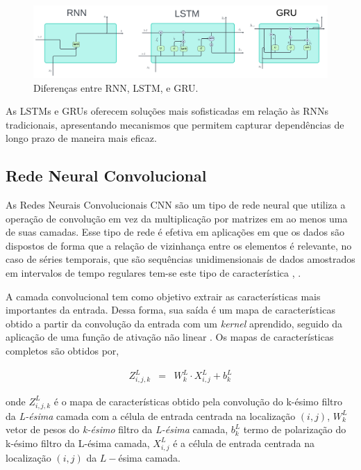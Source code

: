  \begin{figure}[!htb]
 	\centering
 	\caption{Diferenças entre RNN, LSTM, e GRU.}
 	\label{fig:rnn-vs-lstm-vs-gru-1024x308}
 	\includegraphics[width=\linewidth]{Modelos/Figuras/RNN-vs-LSTM-vs-GRU-1024x308.pdf}
 \end{figure}
 
  As LSTMs e GRUs oferecem soluções mais sofisticadas em relação às RNNs tradicionais, apresentando mecanismos que permitem capturar dependências de longo prazo de maneira mais eficaz.
 
 \subsection{Rede Neural Convolucional}
 
As Redes Neurais Convolucionais CNN são um tipo de rede neural que utiliza a operação de convolução em vez da multiplicação por matrizes em ao menos uma de suas camadas. Esse tipo de rede é efetiva em aplicações em que os dados são dispostos de forma que a relação de vizinhança entre os elementos é relevante, no caso de séries temporais, que são sequências unidimensionais de dados amostrados em intervalos de tempo regulares tem-se este tipo de característica \cite{silva_2021}, \cite{7533055} .
 
A camada convolucional tem como objetivo extrair as características mais importantes da entrada. Dessa forma, sua saída é um mapa de características obtido a partir da convolução da entrada com um \textit{kernel} aprendido, seguido da aplicação de uma função de ativação não linear \cite{lucas_2019}. Os mapas de características completos são obtidos por,
 
 \begin{eqnarray}
 	Z_{i, j, k}^L&=&W_k^L \cdot X_{i, j}^L+b_k^L\label{cnn}
 \end{eqnarray}
 
\noindent onde $Z_{i, j, k}^L$ é o mapa de características obtido pela convolução do k-ésimo filtro da \textit{L-ésima} camada com a célula de entrada centrada na localização $(i, j)$, $W_k^L$ vetor de pesos do \textit{k-ésimo} filtro da \textit{L-ésima} camada, $b_k^L$ termo de polarização do k-ésimo filtro da L-ésima camada,  $X_{i, j}^L$ é a célula de entrada centrada na localização $(i,j)$ da $L-$ésima camada.

